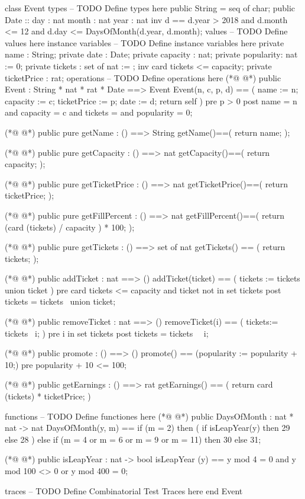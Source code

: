 \begin{vdmpp}[breaklines=true]
class Event
types
-- TODO Define types here
  public String = seq of char;
  public Date :: day : nat
          month : nat
          year : nat
  inv d == d.year > 2018 and 
    d.month <= 12 and
    d.day <=  DaysOfMonth(d.year, d.month);
values
-- TODO Define values here
instance variables
-- TODO Define instance variables here
 private name : String;
 private date : Date;
 private capacity : nat;
 private popularity: nat := 0;
 private tickets : set of nat := {};
  inv card tickets <= capacity;
 private ticketPrice : rat;
operations
-- TODO Define operations here
(*@
\label{Event:24}
@*)
 public Event : String * nat * rat * Date ==> Event
 Event(n, c, p, d) == (
  name := n; 
  capacity := c; 
  ticketPrice := p;
  date := d; 
  return self
 )
 pre p > 0
 post name = n and capacity = c and tickets = {} and popularity = 0;
    
(*@
\label{getName:35}
@*)
 public pure getName : () ==> String
 getName()==(
  return name;
 );
 
(*@
\label{getCapacity:40}
@*)
 public pure getCapacity : () ==> nat
 getCapacity()==(
  return capacity;
 );
 
(*@
\label{getTicketPrice:45}
@*)
 public pure getTicketPrice : () ==> nat
 getTicketPrice()==(
  return ticketPrice;
 );
 
(*@
\label{getFillPercent:50}
@*)
 public pure getFillPercent : () ==> nat
 getFillPercent()==(
  return (card (tickets) / capacity ) * 100;
 );
 
(*@
\label{getTickets:55}
@*)
 public pure getTickets : () ==> set of nat
 getTickets() == (
  return tickets;
 );
 
(*@
\label{addTicket:60}
@*)
 public addTicket : nat ==> ()
 addTicket(ticket) == (
  tickets := tickets union {ticket}
 )
 pre card tickets <= capacity and ticket not in set tickets
 post tickets = tickets~ union {ticket};
 
(*@
\label{removeTicket:67}
@*)
 public removeTicket : nat ==> ()
 removeTicket(i) == (
  tickets:= tickets \ {i}; 
 )
 pre i in set tickets
 post tickets = tickets~ \ {i}; 
 
(*@
\label{promote:74}
@*)
 public promote : () ==> ()
 promote() == (popularity := popularity + 10;)
 pre popularity + 10 <= 100;
 
(*@
\label{getEarnings:78}
@*)
 public getEarnings : () ==> rat
 getEarnings() == (
  return card (tickets) * ticketPrice; 
 )
 
functions
-- TODO Define functiones here
(*@
\label{DaysOfMonth:85}
@*)
 public DaysOfMonth : nat * nat -> nat
 DaysOfMonth(y, m) == 
  if (m = 2) then (
   if isLeapYear(y) then 29
   else 28
  )
  else if (m = 4 or m = 6 or m = 9 or m = 11) then 30
  else 31;
 
(*@
\label{isLeapYear:94}
@*)
 public isLeapYear : nat -> bool
 isLeapYear (y) ==
  y mod 4 = 0 and y mod 100 <> 0 or y mod 400 = 0;
  
traces
-- TODO Define Combinatorial Test Traces here
end Event
\end{vdmpp}
